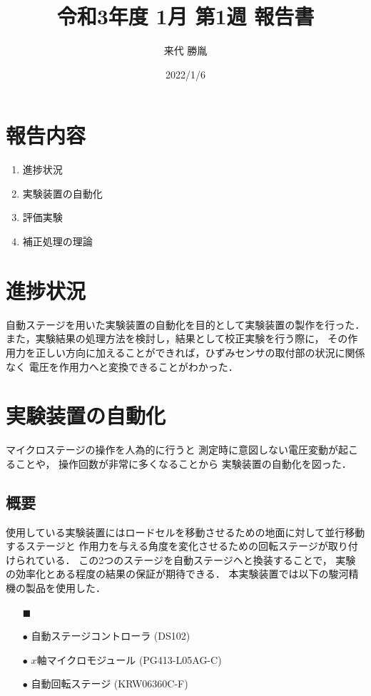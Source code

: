 \documentclass[twocolumn,a4j]{jsarticle}
\author{来代 勝胤}
\title{令和3年度 1月 第1週 報告書}
\date{2022/1/6}
\begin{document}
\columnseprule=0.1mm

\maketitle
\section*{報告内容}
\begin{enumerate}[1.]
    \item 進捗状況
    \item 実験装置の自動化
    \item 評価実験
    \item 補正処理の理論
\end{enumerate}

\section{進捗状況}
自動ステージを用いた実験装置の自動化を目的として実験装置の製作を行った．
また，実験結果の処理方法を検討し，結果として校正実験を行う際に，
その作用力を正しい方向に加えることができれば，ひずみセンサの取付部の状況に関係なく
電圧を作用力へと変換できることがわかった．

\section{実験装置の自動化}
マイクロステージの操作を人為的に行うと
測定時に意図しない電圧変動が起こることや，
操作回数が非常に多くなることから
実験装置の自動化を図った．\\

\subsection{概要}
使用している実験装置にはロードセルを移動させるための地面に対して並行移動するステージと
作用力を与える角度を変化させるための回転ステージが取り付けられている．
この2つのステージを自動ステージヘと換装することで，
実験の効率化とある程度の結果の保証が期待できる．
本実験装置では以下の駿河精機の製品を使用した．

\begin{itemize}
    \item [$\blacksquare$] 
    \item [$\bullet$] 自動ステージコントローラ (DS102)
    \item [$\bullet$] $x$軸マイクロモジュール (PG413-L05AG-C)
    \item [$\bullet$] 自動回転ステージ (KRW06360C-F)
\end{itemize}
\end{document}
